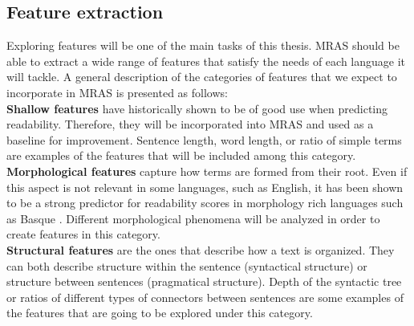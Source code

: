 \documentclass{bsu-ms}
\begin{document}




\subsection{Feature extraction}
Exploring features will be one of the main tasks of this thesis. MRAS should be able to extract a wide range of features that satisfy the needs of each language it will tackle. A general description of the categories of features that we expect to incorporate in MRAS is presented as follows:\\


\noindent
\textbf{Shallow features} \cite{flesch1948new,chall1995readability,albright1996readability} have historically shown to be of good use when predicting readability. Therefore, they will be incorporated into MRAS and used as a baseline for improvement. Sentence length, word length, or ratio of simple terms are examples of the features that will be included among this category.\\



\noindent
\textbf{Morphological features} capture how terms are formed from their root. Even if this  aspect is not relevant in some languages, such as English, it has been shown to be a strong predictor for readability scores in morphology rich languages such as Basque \cite{gonzalez2014simple}. Different morphological phenomena will be analyzed in order to create features in this category.\\

\noindent
\textbf{Structural features} are the ones that describe how a text is organized. They can both describe structure within the sentence (syntactical structure) or structure between sentences (pragmatical structure). Depth of the syntactic tree or ratios of different types of connectors between sentences are some examples of the features that are going to be explored under this category.\\
\end{document}
